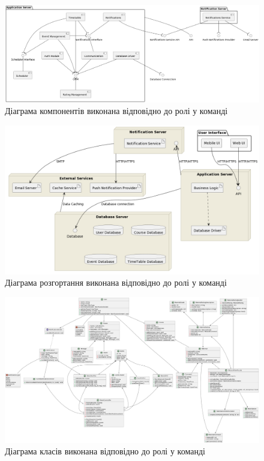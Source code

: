 \documentclass[oneside,14pt]{extarticle}
\begin{document}
\begin{normalsize}
	\begin{figure}[H]
		\centering
		\includegraphics[width=\textwidth]{component}
		\caption{Діаграма компонентів виконана відповідно до ролі у команді}
	\end{figure}
	
	\begin{figure}[H]
		\centering
		\includegraphics[width=\textwidth]{deployment}
		\caption{Діаграма розгортання виконана відповідно до ролі у команді}
	\end{figure}
	
	\begin{figure}[H]
		\centering
		\includegraphics[width=\textwidth]{classes}
		\caption{Діаграма класів виконана відповідно до ролі у команді}
	\end{figure}
		

\end{normalsize}
\end{document}
